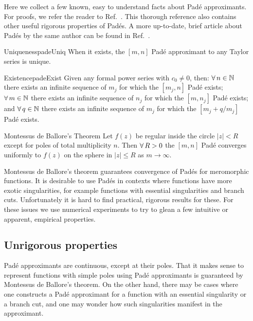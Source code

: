 Here we collect a few known, easy to understand 
facts about Pad\'e approximants. For proofs, we refer
the reader to Ref.~\cite{baker_essentials_1975}. This thorough reference also
contains other useful rigorous properties of Pad\'es. A more up-to-date, brief
article about Pad\'es by the same author can be found in
Ref.~\cite{Jr:2012}.

\begin{theorem}{Uniqueness}{padeUniq}
When it exists, the $[m,n]$ Pad\'e approximant to any Taylor series is unique.
\end{theorem}

\begin{theorem}{Existence}{padeExist}
Given any formal power series with $c_0\neq0$,
then: $\operatorname{\forall} n\in\mathbb{N}$ there exists an infinite sequence of $m_j$ for which the
$[m_j,n]$ Pad\'e exists; $\operatorname{\forall} m\in\mathbb{N}$ there exists an infinite sequence of $n_j$ for
which the $[m,n_j]$ Pad\'e exists; and $\operatorname{\forall} q\in\mathbb{N}$ there exists an infinite
sequence of $m_j$ for which the $[m_j + q/m_j]$ Pad\'e exists.
\end{theorem}

\begin{theorem}{Montessus de Ballore's Theorem}{}
Let $f(z)$ be regular inside the circle $|z|<R$ except for poles of total
multiplicity $n$. Then $\operatorname{\forall} R>0$
the $[m,n]$ Pad\'e converges uniformly
to $f(z)$ on the sphere in $|z|\leq R$ as $m\to\infty$.
\end{theorem}

Montessus de Ballore's theorem guarantees convergence of Pad\'es for meromorphic
functions. It is desirable to use Pad\'es in contexts where functions have more
exotic singularities, for example functions with essential singularities and
branch cuts. Unfortunately it is hard to find practical, rigorous results for
these. For these issues we use numerical experiments to try to glean a few
intuitive or apparent, empirical properties. 


\subsection{Unrigorous properties}



Pad\'e approximants are continuous, except at their poles. That it makes sense
to represent functions with simple poles using Pad\'e approximants is guaranteed
by Montessus de Ballore's theorem. On the other hand,
there may be cases where one constructs a Pad\'e approximant for a function with
an essential singularity or a branch cut, and one may wonder how such
singularities manifest in the approximant.


